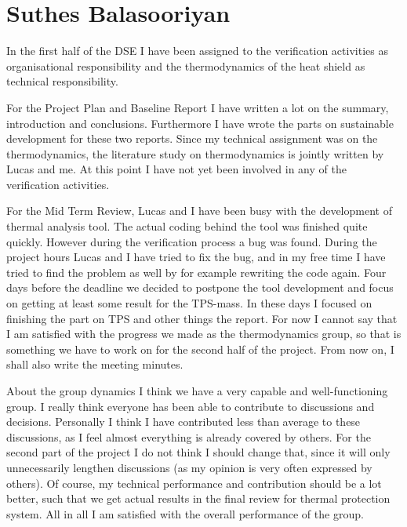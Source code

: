 \section{Suthes Balasooriyan}

In the first half of the DSE I have been assigned to the verification activities as organisational responsibility and the thermodynamics of the heat shield as technical responsibility.

For the Project Plan and Baseline Report I have written a lot on the summary, introduction and conclusions. Furthermore I have wrote the parts on sustainable development for these two reports. Since my technical assignment was on the thermodynamics, the literature study on thermodynamics is jointly written by Lucas and me. At this point I have not yet been involved in any of the verification activities.

For the Mid Term Review, Lucas and I have been busy with the development of thermal analysis tool. The actual coding behind the tool was finished quite quickly. However during the verification process a bug was found. During the project hours Lucas and I have tried to fix the bug, and in my free time I have tried to find the problem as well by for example rewriting the code again. Four days before the deadline we decided to postpone the tool development and focus on getting at least some result for the TPS-mass. In these days I focused on finishing the part on TPS and other things the report. For now I cannot say that I am satisfied with the progress we made as the thermodynamics group, so that is something we have to work on for the second half of the project. From now on, I shall also write the meeting minutes.

About the group dynamics I think we have a very capable and well-functioning group. I really think everyone has been able to contribute to discussions and decisions. Personally I think I have contributed less than average to these discussions, as I feel almost everything is already covered by others. For the second part of the project I do not think I should change that, since it will only unnecessarily lengthen discussions (as my opinion is very often expressed by others). Of course, my technical performance and contribution should be a lot better, such that we get actual results in the final review for thermal protection system. All in all I am satisfied with the overall performance of the group.

